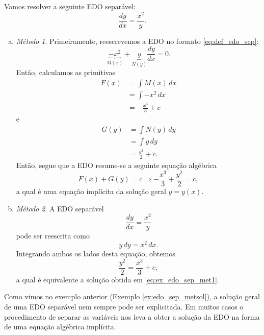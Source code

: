 \begin{ex}\label{ex:edo_sep_metsol}
  Vamos resolver a seguinte EDO separável:
  \begin{equation}
    \frac{dy}{dx} = \frac{x^2}{y}.
  \end{equation}
  \begin{enumerate}[a)]
  \item \emph{Método 1}.
  Primeiramente, reescrevemos a EDO no formato \eqref{eq:def_edo_sep}:
  \begin{equation}
    \underbrace{-x^2}_{M(x)} + \underbrace{y}_{N(y)}\frac{dy}{dx} = 0.
  \end{equation}
  Então, calculamos as primitivas
  \begin{align}
    F(x) &= \int M(x)\,dx\\
         &= \int -x^2\,dx \\
         &= -\frac{x^3}{3} + c
  \end{align}
  e
  \begin{align}
    G(y) &= \int N(y)\,dy \\
         &= \int y\,dy \\
         &= \frac{y^2}{2} + c.
  \end{align}
  Então, segue que a EDO resume-se a seguinte equação algébrica
  \begin{equation}\label{eq:ex_edo_sep_met1}
    F(x) + G(y) = c \Rightarrow -\frac{x^3}{3} + \frac{y^2}{2} = c,
  \end{equation}
  a qual é uma equação implícita da solução geral $y = y(x)$.
\item \emph{Método 2}.
  A EDO separável
  \begin{equation}
    \frac{dy}{dx} = \frac{x^2}{y}
  \end{equation}
  pode ser reescrita como
  \begin{equation}
    y\,dy = x^2\,dx.
  \end{equation}
  Integrando ambos os lados desta equação, obtemos
  \begin{equation}
    \frac{y^2}{2} = \frac{x^3}{3} + c,
  \end{equation}
  a qual é equivalente a solução obtida em \eqref{eq:ex_edo_sep_met1}.
  \end{enumerate}
\end{ex}

\begin{obs}
  Como vimos no exemplo anterior (Exemplo \ref{ex:edo_sep_metsol}), a solução geral de uma EDO separável nem sempre pode ser explicitada. Em muitos casos o procedimento de separar as variáveis nos leva a obter a solução da EDO na forma de uma equação algébrica implícita.
\end{obs}


